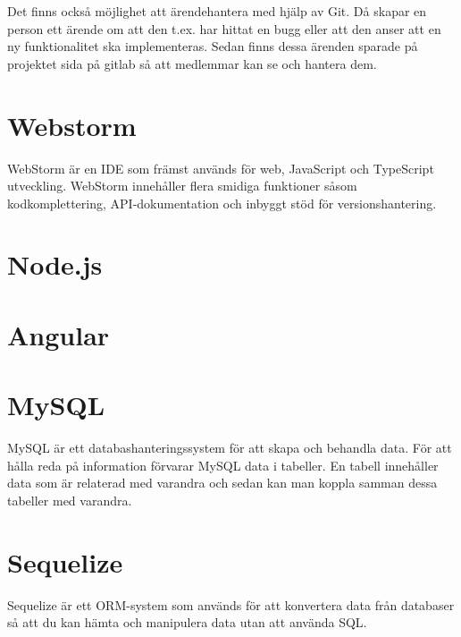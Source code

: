 Det finns också möjlighet att ärendehantera med hjälp av Git.
Då skapar en person ett ärende om att den t.ex. har hittat en bugg eller att den anser att en ny funktionalitet ska implementeras.
Sedan finns dessa ärenden sparade på projektet sida på gitlab så att medlemmar kan se och hantera dem. \cite{gitlab}

\section{Webstorm}
WebStorm är en IDE som främst används för web, JavaScript och TypeScript utveckling. WebStorm innehåller flera smidiga funktioner såsom kodkomplettering, API-dokumentation och inbyggt stöd för versionshantering. \cite{webstorm}

\section{Node.js}

\section{Angular}

\section{MySQL}
MySQL är ett databashanteringssystem för att skapa och behandla data. För att hålla reda på information förvarar MySQL data i tabeller. En tabell innehåller data som är relaterad med varandra och sedan kan man koppla samman dessa tabeller med varandra.
\cite{mysql}

\section{Sequelize}
Sequelize är ett ORM-system som används för att konvertera data från databaser så att du kan hämta och manipulera data utan att använda SQL.
\cite{sequelize}
